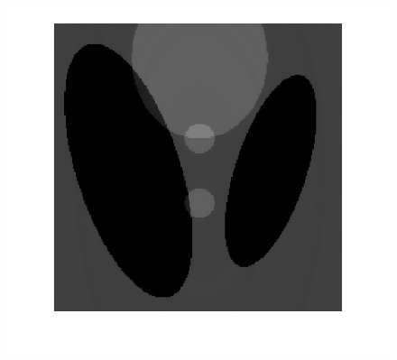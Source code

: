 \documentclass[hyperref]{ctexart}
\begin{document}
{\begin{figure}[htbp]
{				\includegraphics[scale=0.2]{33-1.png}
			}
			\quad
			\quad
			\subfigure[pic5.]{
}
\end{figure}}
\end{document}
